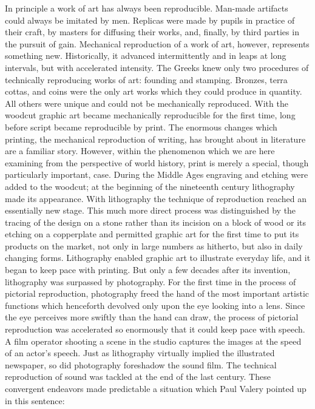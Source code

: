 \documentclass{article}
\begin{document}
 In principle a work of art has always been reproducible. Man-made artifacts
 could always be imitated by men. Replicas were made by pupils in practice of
 their craft, by masters for diffusing their works, and, finally, by third
 parties in the pursuit of gain. Mechanical reproduction of a work of art,
 however, represents something new. Historically, it advanced intermittently
 and in leaps at long intervals, but with accelerated intensity. The Greeks
 knew only two procedures of technically reproducing works of art: founding and
 stamping. Bronzes, terra cottas, and coins were the only art works which they
 could produce in quantity. All others were unique and could not be
 mechanically reproduced. With the woodcut graphic art became mechanically
 reproducible for the first time, long before script became reproducible by
 print. The enormous changes which printing, the mechanical reproduction of
 writing, has brought about in literature are a familiar story. However, within
 the phenomenon which we are here examining from the perspective of world
 history, print is merely a special, though particularly important, case.
 During the Middle Ages engraving and etching were added to the woodcut; at the
 beginning of the nineteenth century lithography made its appearance. With
 lithography the technique of reproduction reached an essentially new stage.
 This much more direct process was distinguished by the tracing of the design
 on a stone rather than its incision on a block of wood or its etching on a
 copperplate and permitted graphic art for the first time to put its products
 on the market, not only in large numbers as hitherto, but also in daily
 changing forms. Lithography enabled graphic art to illustrate everyday life,
 and it began to keep pace with printing. But only a few decades after its
 invention, lithography was surpassed by photography. For the first time in the
 process of pictorial reproduction, photography freed the hand of the most
 important artistic functions which henceforth devolved only upon the eye
 looking into a lens. Since the eye perceives more swiftly than the hand can
 draw, the process of pictorial reproduction was accelerated so enormously that
 it could keep pace with speech. A film operator shooting a scene in the studio
 captures the images at the speed of an actor’s speech. Just as lithography
 virtually implied the illustrated newspaper, so did photography foreshadow the
 sound film. The technical reproduction of sound was tackled at the end of the
 last century. These convergent endeavors made predictable a situation which
 Paul Valery pointed up in this sentence:
\end{document}
